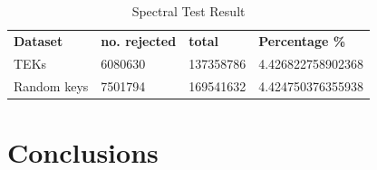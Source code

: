 \begin{table}[H]
\centering
\begin{tabular}{|l|l|l|l|}
\cline{1-4}
\textbf{Dataset} & \textbf{no. rejected}        & \textbf{total} & \textbf{Percentage \%}\\ \cline{1-4}
TEKs             & 6080630  & 137358786    & 4.426822758902368 \\ \cline{1-4}
Random keys      & 7501794 &   169541632   &  4.424750376355938 \\ \cline{1-4}
\end{tabular}
\caption{Spectral Test Result}
\label{table}
\end{table}

\section{Conclusions}